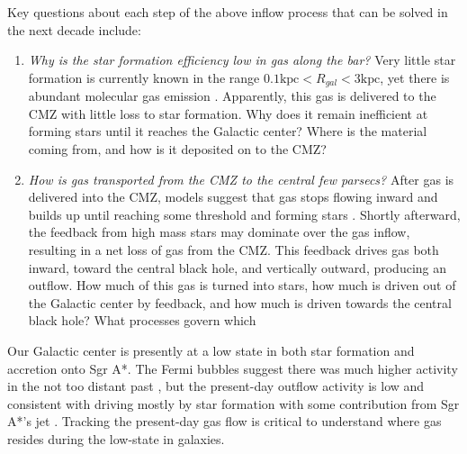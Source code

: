 \documentclass[modern]{aastex62}
\def\agnote#1{{\color{red}#1}}
\begin{document}
Key questions about each step of the above inflow process that can be solved in
the next decade include:
\begin{enumerate}
    \item 
\textit{Why is the star formation efficiency low in gas along the bar?}
Very little star formation is currently known in the range $0.1 \mathrm{kpc} <
R_{gal} < 3 \mathrm{kpc}$, yet there is abundant molecular gas emission
\citep[e.g.][]{Dame2001a}.  Apparently, this gas is delivered to the CMZ
with little loss to star formation.  Why does it remain inefficient
at forming stars until it reaches the Galactic center?  Where is the material
coming from, and how is it deposited on to the CMZ?


%

    \item 
\textit{How is gas transported from the CMZ to the central few parsecs?}
After gas is delivered into the CMZ, models suggest that gas stops flowing
inward and builds up until reaching some threshold and forming stars
\citep{Kruijssen2014c,Krumholz2017a,Sormani2018b,Jeffreson2018b}.  Shortly
afterward, the feedback from high mass stars may dominate over the gas inflow,
resulting in a net loss of gas from the CMZ.  This feedback drives gas both
inward, toward the central black hole, and vertically outward, producing an
outflow. How much of this gas is turned into stars, how much is driven out of
the Galactic center by feedback, and how much is driven towards the central
black hole?  What processes govern which 
\end{enumerate}

Our Galactic center is presently at a low state in both star formation and
accretion onto Sgr A*.  The Fermi bubbles suggest there was much higher
activity in the not too distant past \citep{Su2010a}, but the present-day
outflow activity is low and consistent with driving mostly by star formation
\citep{Law2009a,Law2010a} with some contribution from Sgr A*'s jet
\citep{Muno2008a,Li2013a,Zhu2018a}. Tracking the present-day gas flow is critical
to understand where gas resides during the low-state in galaxies.
\end{document}

